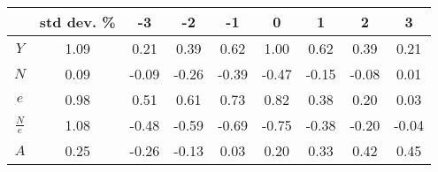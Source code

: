 \begin{tabular}{ccccccccc}
\toprule
 & std dev. \% & -3 & -2 & -1 & 0 & 1 & 2 & 3 \\
\midrule
$Y$ & 1.09 & 0.21 & 0.39 & 0.62 & 1.00 & 0.62 & 0.39 & 0.21 \\
$N$ & 0.09 & -0.09 & -0.26 & -0.39 & -0.47 & -0.15 & -0.08 & 0.01 \\
$e$ & 0.98 & 0.51 & 0.61 & 0.73 & 0.82 & 0.38 & 0.20 & 0.03 \\
$\frac{N}{e}$ & 1.08 & -0.48 & -0.59 & -0.69 & -0.75 & -0.38 & -0.20 & -0.04 \\
$A$ & 0.25 & -0.26 & -0.13 & 0.03 & 0.20 & 0.33 & 0.42 & 0.45 \\
\bottomrule
\end{tabular}
